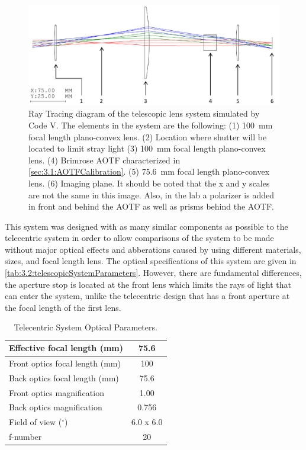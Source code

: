 \begin{figure}[h!]
    \includegraphics[width=1.0\textwidth]{./Images/3-2-TelescopicRayTracing.pdf}
    \caption[ALI Telescopic Design Prototype]{Ray Tracing diagram of the telescopic lens system simulated by Code V. The elements in the system are the following: (1) 100~mm focal length plano-convex lens. (2) Location where shutter will be located to limit stray light (3) 100~mm focal length plano-convex lens. (4) Brimrose AOTF characterized in \autoref{sec:3.1:AOTFCalibration}. (5) 75.6~mm focal length plano-convex lens. (6) Imaging plane. It should be noted that the x and y scales are not the same in this image. Also, in the lab a polarizer is added in front and behind the AOTF as well as prisms behind the AOTF.}
    \label{fig:3.2:telescopicRayTracing}
\end{figure}

This system was designed with as many similar components as possible to the telecentric system in order to allow comparisons of the system to be made without major optical effects and abberations caused by using different materials, sizes, and focal length lens. The optical specifications of this system are given in \autoref{tab:3.2:telescopicSystemParameters}. However, there are fundamental differences, the aperture stop is located at the front lens which limits the rays of light that can enter the system, unlike the telecentric design that has a front aperture at the focal length of the first lens.


\begin{table}[h!]
    \begin{center}
    \begin{tabular}{|l|c|}
    \hline
    Effective focal length (mm) & 75.6 \\
    \hline
    Front optics focal length (mm) & 100 \\
    \hline
    Back optics focal length (mm) & 75.6 \\
    \hline
    Front optics magnification & 1.00 \\
    \hline
    Back optics magnification & 0.756 \\
    \hline
    Field of view ($^{\circ}$) & 6.0 x 6.0 \\
    \hline
    f-number & 20 \\
    \hline
    \end{tabular}
    \end{center}
    \caption{Telecentric System Optical Parameters.}
    \label{tab:3.2:telescopicSystemParameters}
\end{table}

